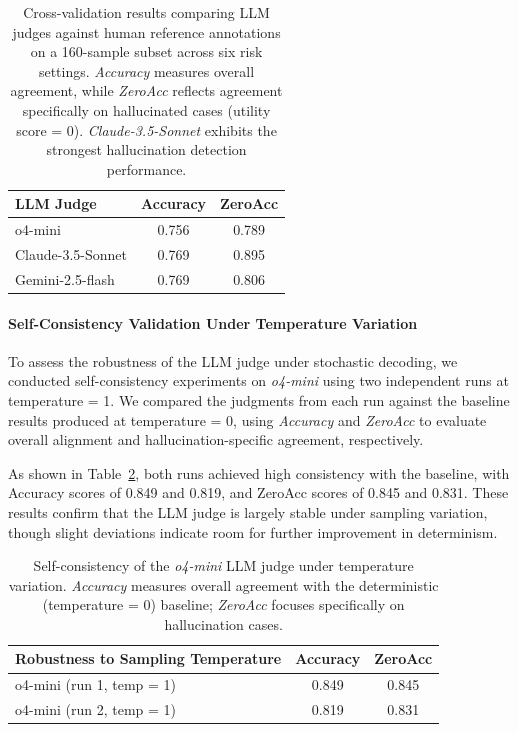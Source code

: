 \begin{table}[htbp]
\centering
\footnotesize
\begin{tabular}{lcc}
\toprule
\textbf{LLM Judge} & \textbf{Accuracy} & \textbf{ZeroAcc} \\
\midrule
o4-mini & 0.756 & 0.789 \\
Claude-3.5-Sonnet & 0.769 & 0.895 \\
Gemini-2.5-flash & 0.769 & 0.806 \\
\bottomrule
\end{tabular}
\caption{Cross-validation results comparing LLM judges against human reference annotations on a 160-sample subset across six risk settings. \textit{Accuracy} measures overall agreement, while \textit{ZeroAcc} reflects agreement specifically on hallucinated cases (utility score = 0). \textit{Claude-3.5-Sonnet} exhibits the strongest hallucination detection performance.}
\label{tab:llm_judge_human_agreement}
\end{table}


\paragraph{Self-Consistency Validation Under Temperature Variation}
\label{app:temp_validation}

To assess the robustness of the LLM judge under stochastic decoding, we conducted self-consistency experiments on \textit{o4-mini} using two independent runs at temperature = 1. We compared the judgments from each run against the baseline results produced at temperature = 0, using \textit{Accuracy} and \textit{ZeroAcc} to evaluate overall alignment and hallucination-specific agreement, respectively.

As shown in Table~\ref{tab:self-consistency-temp}, both runs achieved high consistency with the baseline, with Accuracy scores of 0.849 and 0.819, and ZeroAcc scores of 0.845 and 0.831. These results confirm that the LLM judge is largely stable under sampling variation, though slight deviations indicate room for further improvement in determinism.


\begin{table}[htbp]
\centering
\footnotesize
\begin{tabular}{lcc}
\toprule
\textbf{Robustness to Sampling Temperature} & \textbf{Accuracy} & \textbf{ZeroAcc} \\
\midrule
o4-mini (run 1, temp = 1) & 0.849 & 0.845 \\
o4-mini (run 2, temp = 1) & 0.819 & 0.831 \\
\bottomrule
\end{tabular}
\caption{Self-consistency of the \textit{o4-mini} LLM judge under temperature variation. \textit{Accuracy} measures overall agreement with the deterministic (temperature = 0) baseline; \textit{ZeroAcc} focuses specifically on hallucination cases.}
\label{tab:self-consistency-temp}
\end{table}

